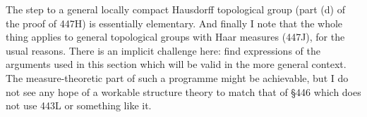 {The step to a general locally compact Hausdorff topological group (part
(d) of the proof of 447H) is essentially elementary.   And finally I
note that the whole thing applies to general topological groups with
Haar measures (447J), for the usual reasons.   There is an implicit
challenge here:  find expressions of the arguments used in this section
which will be valid in the more general context.   The measure-theoretic
part of such a programme might be achievable, but I do not see any hope
of a workable structure theory to match that of \S446 which does not use
443L or something like it.
}%

\discrpage



